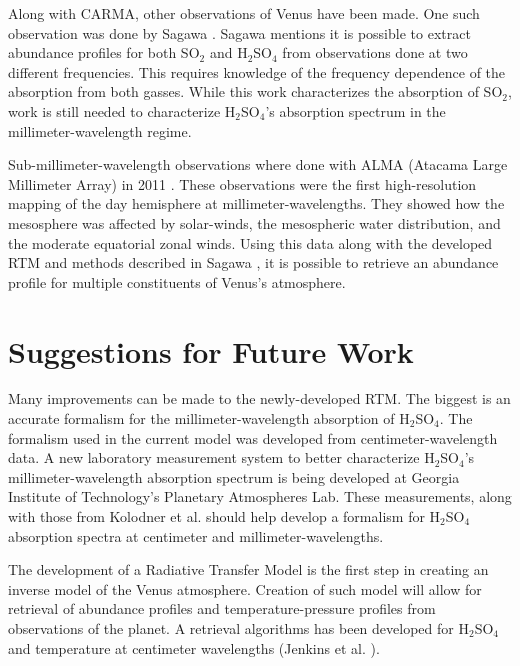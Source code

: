 Along with CARMA, other observations of Venus have been made. One such observation was done by Sagawa \cite{Sagawa-2008}. Sagawa mentions it is possible to extract abundance profiles for both SO$_2$ and H$_2$SO$_4$ from observations done at two different frequencies. This requires knowledge of the frequency dependence of the absorption from both gasses. While this work characterizes the absorption of SO$_2$, work is still needed to characterize H$_2$SO$_4$'s absorption spectrum in the millimeter-wavelength regime. 

Sub-millimeter-wavelength observations where done with ALMA (Atacama Large Millimeter Array) in 2011 \cite{ALMA-2013}. These observations were the first high-resolution mapping of the day hemisphere at millimeter-wavelengths. They showed how the mesosphere was affected by solar-winds, the mesospheric water distribution, and the moderate equatorial zonal winds. Using this data along with the developed RTM and methods described in Sagawa \cite{Sagawa-2008}, it is possible to retrieve an abundance profile for multiple constituents of Venus's atmosphere.

\section{Suggestions for Future Work}
Many improvements can be made to the newly-developed RTM. The biggest is an accurate formalism for the millimeter-wavelength absorption of H$_2$SO$_4$. The formalism used in the current model was developed from centimeter-wavelength data. A new laboratory measurement system to better characterize H$_2$SO$_4$'s millimeter-wavelength absorption spectrum is being developed at Georgia Institute of Technology's Planetary Atmospheres Lab. These measurements, along with those from Kolodner et al. \cite{Kolodner-1998} should help develop a formalism for H$_2$SO$_4$ absorption spectra at centimeter and millimeter-wavelengths. 

The development of a Radiative Transfer Model is the first step in creating an inverse model of the Venus atmosphere. Creation of such model will allow for retrieval of abundance profiles and temperature-pressure profiles from observations of the planet. A retrieval algorithms has been developed for H$_2$SO$_4$ and temperature at centimeter wavelengths (Jenkins et al. \cite{Jenkins-2002}).